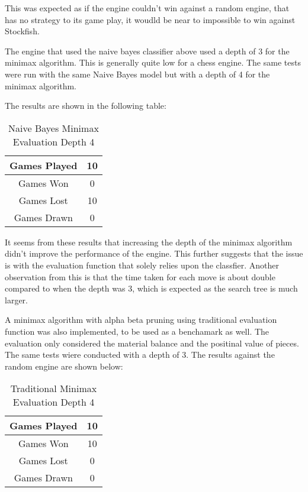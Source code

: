This was expected as if the engine couldn't win against a random engine, that has no strategy to its game play, it woudld be near to impossible to win against Stockfish. 

The engine that used the naive bayes classifier above used a depth of 3 for the minimax algorithm. This is generally quite low for a chess engine. The same tests were run with the same Naive Bayes model but with a depth of 4 for the minimax algorithm. 

The results are shown in the following table:

\begin{table}[H]
    \centering
    \begin{tabular}{|c|c|}
    \hline
    Games Played        & 10           \\ \hline
    Games Won           & 0           \\ \hline
    Games Lost          & 10          \\ \hline
    Games Drawn         & 0           \\ \hline
    \end{tabular}
    \caption{Naive Bayes Minimax Evaluation Depth 4}
    \label{tab:naive_bayes_minimax_evaluation_depth_4}
\end{table}

It seems from these results that increasing the depth of the minimax algorithm didn't improve the performance of the engine. This further suggests that the issue is with the evaluation function that solely relies upon the classfier. Another observation from this is that the time taken for each move is about double compared to when the depth was 3, which is expected as the search tree is much larger. 

A minimax algorithm with alpha beta pruning using traditional evaluation function was also implemented, to be used as a benchamark as well. The evaluation only considered the material balance and the positinal value of pieces. The same tests wiere conducted with a depth of 3. The results against the random engine are shown below:

\begin{table}[H]
    \centering
    \begin{tabular}{|c|c|}
    \hline
    Games Played        & 10           \\ \hline
    Games Won           & 10           \\ \hline
    Games Lost          & 0          \\ \hline
    Games Drawn         & 0          \\ \hline
    \end{tabular}
    \caption{Traditional Minimax Evaluation Depth 4}
    \label{tab:traditional_minimax_evaluation_depth_4}
\end{table}

